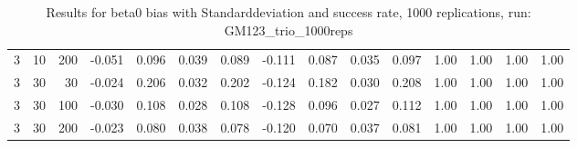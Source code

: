 \begin{table}[ht]
\begin{tabular}{lrrrrrrrrrrrrrr}
  3 & 10 & 200 & -0.051 & 0.096 & 0.039 & 0.089 & -0.111 & 0.087 & 0.035 & 0.097 & 1.00 & 1.00 & 1.00 & 1.00 \\ 
  3 & 30 & 30 & -0.024 & 0.206 & 0.032 & 0.202 & -0.124 & 0.182 & 0.030 & 0.208 & 1.00 & 1.00 & 1.00 & 1.00 \\ 
  3 & 30 & 100 & -0.030 & 0.108 & 0.028 & 0.108 & -0.128 & 0.096 & 0.027 & 0.112 & 1.00 & 1.00 & 1.00 & 1.00 \\ 
  3 & 30 & 200 & -0.023 & 0.080 & 0.038 & 0.078 & -0.120 & 0.070 & 0.037 & 0.081 & 1.00 & 1.00 & 1.00 & 1.00 \\ 
   \hline
\end{tabular}
\caption{Results for beta0 bias with Standarddeviation and success rate, 1000 replications, run: GM123_trio_1000reps} 
\label{tab:beta0_bias_sd_success}
\end{table}
